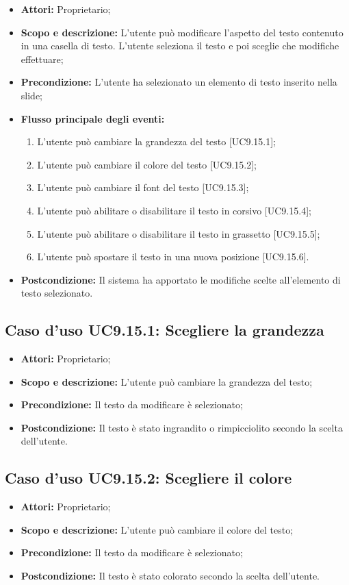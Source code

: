 \begin{itemize}
	\item \textbf{Attori:} Proprietario;
	\item \textbf{Scopo e descrizione:} L'utente può modificare l'aspetto del testo contenuto in una casella di testo. L'utente seleziona il testo e poi sceglie che modifiche effettuare;
	\item \textbf{Precondizione:} L'utente ha selezionato un elemento di testo inserito nella \gls{slide};
	\item \textbf{Flusso principale degli eventi:}
	\begin{enumerate}
		\item L'utente può cambiare la grandezza del testo [UC9.15.1];
		\item L'utente può cambiare il colore del testo [UC9.15.2];
		\item L'utente può cambiare il \gls{font} del testo [UC9.15.3];
		\item L'utente può abilitare o disabilitare il testo in corsivo [UC9.15.4];
		\item L'utente può abilitare o disabilitare il testo in grassetto [UC9.15.5];
		\item L'utente può spostare il testo in una nuova posizione [UC9.15.6].
	\end{enumerate}
	\item \textbf{Postcondizione:} Il sistema ha apportato le modifiche scelte all'elemento di testo selezionato.
\end{itemize}

\subsection{Caso d'uso UC9.15.1: Scegliere la grandezza}
\begin{itemize}
	\item \textbf{Attori:} Proprietario;
	\item \textbf{Scopo e descrizione:} L'utente può cambiare la grandezza del testo;
	\item \textbf{Precondizione:} Il testo da modificare è selezionato;
	\item \textbf{Postcondizione:} Il testo è stato ingrandito o rimpicciolito secondo la scelta dell'utente.
\end{itemize}

\subsection{Caso d'uso UC9.15.2: Scegliere il colore}
\begin{itemize}
	\item \textbf{Attori:} Proprietario;
	\item \textbf{Scopo e descrizione:} L'utente può cambiare il colore del testo;
	\item \textbf{Precondizione:} Il testo da modificare è selezionato;
	\item \textbf{Postcondizione:} Il testo è stato colorato secondo la scelta dell'utente.
\end{itemize}

